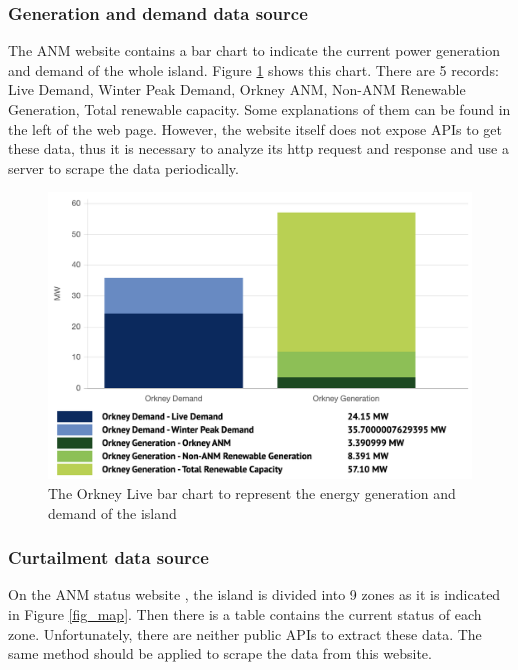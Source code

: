 \documentclass[12pt,a4paper]{report}
\begin{document}
            \subsubsection{Generation and demand data source}
            \label{text_generation_and_demand_data_source}
                The ANM website \cite{website:ANM} contains a bar chart to indicate the current power generation and demand of the whole
                island. Figure \ref{fig_anm_barchart} shows this chart. There are 5 records: Live Demand, Winter Peak Demand, Orkney ANM, Non-ANM Renewable Generation, Total renewable capacity.
                Some explanations of them can be found in the left of the web page.
                However, the website itself does not expose APIs to get these data, thus it is necessary to analyze its http request and response and use a 
                server to scrape the data periodically.

                \begin{figure}[ht]
                    \centerline{\includegraphics[scale=1]{anm_barchart}}
                    \caption{The Orkney Live bar chart to represent the energy generation and demand of the island}
                    \label{fig_anm_barchart}
                \end{figure}
            
            \subsubsection{Curtailment data source}
                On the ANM status website \cite{website:ANMstatus}, the island is divided into 9 zones as it is indicated in Figure \ref{fig_map}. Then there is a 
                table contains the current status of each zone. Unfortunately, there are neither public APIs to extract these data. The same method should
                be applied to scrape the data from this website.
\end{document}
